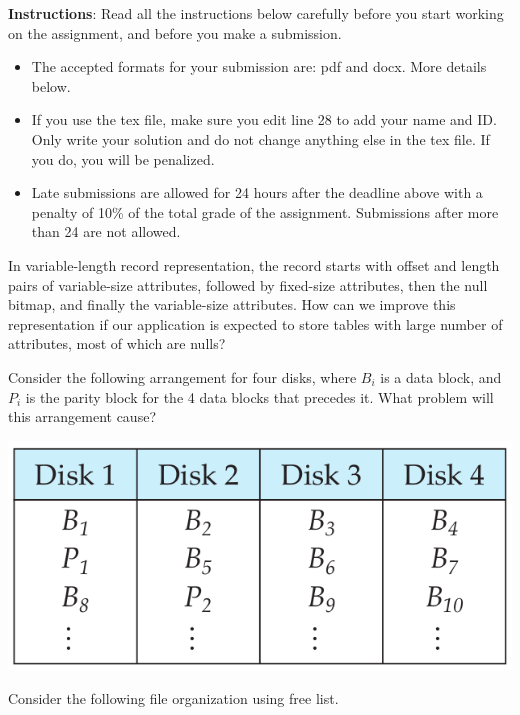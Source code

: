 \documentclass[a4 paper]{article}
\begin{document}
\textbf{Instructions}: Read all the instructions below carefully before you start working on the assignment, and before you make a submission.
\begin{itemize}
    \item The accepted formats for your submission are: pdf and docx. More details below. 
    \item If you use the tex file, make sure you edit line 28 to add your name and ID. Only write your solution and do not change anything else in the tex file. If you do, you will be penalized.
    \item Late submissions are allowed for 24 hours after the deadline above with a penalty of 10\% of the total grade of the assignment. Submissions after more than 24 are not allowed.
\end{itemize}

In variable-length record representation, the record starts with offset and length pairs of variable-size attributes, followed by fixed-size attributes, then the null bitmap, and finally the variable-size attributes. How can we improve this representation if our application is expected to store tables with large number of attributes, most of which are nulls?



Consider the following arrangement for four disks, where $B_{i}$ is a data block, and $P_{i}$ is the parity block for the 4 data blocks that precedes it. What problem will this arrangement cause?

{\centering \includegraphics[width=\textwidth/2]{figure1.png}}





Consider the following file organization using free list.
\end{document}
